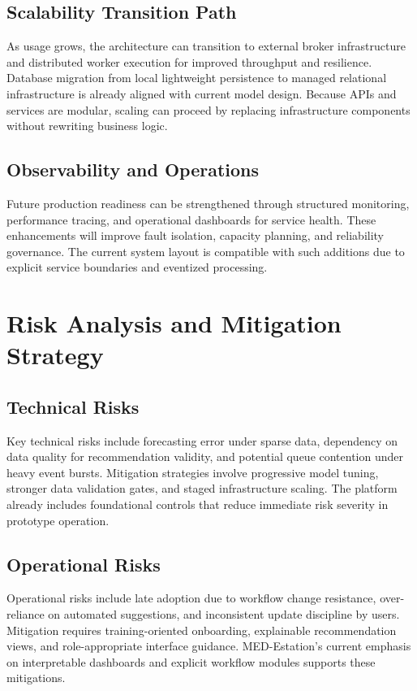 \documentclass[12pt,a4paper]{article}
\begin{document}
\subsection{Scalability Transition Path}
As usage grows, the architecture can transition to external broker infrastructure and distributed worker execution for improved throughput and resilience. Database migration from local lightweight persistence to managed relational infrastructure is already aligned with current model design. Because APIs and services are modular, scaling can proceed by replacing infrastructure components without rewriting business logic.

\subsection{Observability and Operations}
Future production readiness can be strengthened through structured monitoring, performance tracing, and operational dashboards for service health. These enhancements will improve fault isolation, capacity planning, and reliability governance. The current system layout is compatible with such additions due to explicit service boundaries and eventized processing.

\section{Risk Analysis and Mitigation Strategy}
\subsection{Technical Risks}
Key technical risks include forecasting error under sparse data, dependency on data quality for recommendation validity, and potential queue contention under heavy event bursts. Mitigation strategies involve progressive model tuning, stronger data validation gates, and staged infrastructure scaling. The platform already includes foundational controls that reduce immediate risk severity in prototype operation.

\subsection{Operational Risks}
Operational risks include late adoption due to workflow change resistance, over-reliance on automated suggestions, and inconsistent update discipline by users. Mitigation requires training-oriented onboarding, explainable recommendation views, and role-appropriate interface guidance. MED-Estation’s current emphasis on interpretable dashboards and explicit workflow modules supports these mitigations.
\end{document}
